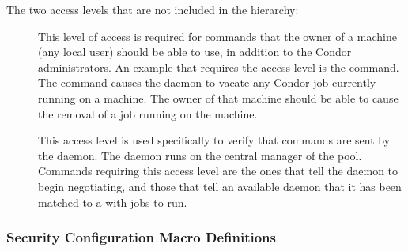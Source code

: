 The two access levels that are not included in the hierarchy:
\begin{description}
\item[] \label{dcperm:owner} This level of access is
   required for commands that the owner of a machine (any local user)
   should be able to use, in addition to the Condor administrators.
   An example that requires the  access level is
   the  command.
   The command causes the  daemon to vacate any
   Condor job currently running on a machine.
   The owner of that machine should be able to cause the removal
   of a job running on the machine.

\item[] \label{dcperm:negotiator} This 
   access level is used specifically to verify that commands are
   sent by the  daemon.
   The  daemon runs on the central manager of
   the pool.
   Commands requiring this access
   level are the ones that tell the  daemon to begin
   negotiating, and those that tell an available  daemon
   that it has been matched to a  with jobs to run.

\end{description}

\subsubsection{\label{sec:Security-macros} Security Configuration Macro Definitions}

